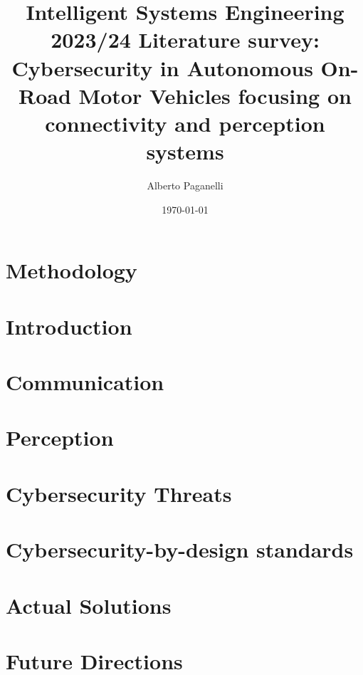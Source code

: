 \documentclass{scrartcl}
\title{\LARGE
Intelligent Systems Engineering 2023/24 \newline
\newline
Literature survey: \\
Cybersecurity in Autonomous On-Road Motor Vehicles focusing on connectivity and perception systems
}
\author{
    Alberto Paganelli \\ \emailaddr{alberto.paganelli3@studio.unibo.it}
}
\date{\today}
\begin{document}
    \maketitle
    \begin{abstract}
    
    \end{abstract}

    \newpage
    \tableofcontents
    \newpage

    \section{Methodology}\label{sec:methodology}
    

    \section{Introduction}\label{sec:introduction}
    

    \section{Communication}\label{sec:communication}
    

    \section{Perception}\label{sec:perception}
    

    \section{Cybersecurity Threats}\label{sec:cybersecurity-threats}
    

    \section{Cybersecurity-by-design standards}\label{sec:cybersecurity-by-design-standards}
    

    \section{Actual Solutions}\label{sec:actual-solutions}
    

    \section{Future Directions}\label{sec:future-directions}
    
\end{document}
